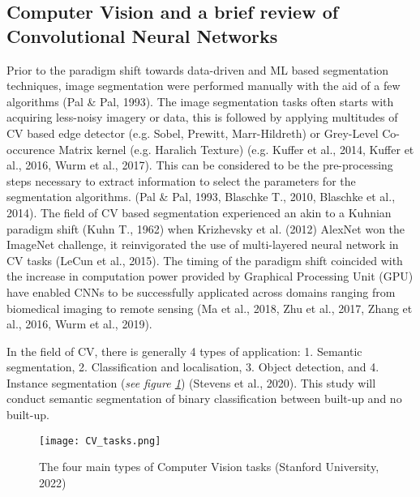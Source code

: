 \documentclass[11pt, a4paper, twoside]{report}
\begin{document}
\subsection{Computer Vision and a brief review of Convolutional Neural Networks}\label{CVinBS}

Prior to the paradigm shift towards data-driven and ML based segmentation techniques, image segmentation were performed manually with the aid of a few algorithms (Pal \& Pal, 1993). The image segmentation tasks often starts with acquiring less-noisy imagery or data, this is followed by applying multitudes of CV based edge detector (e.g. Sobel, Prewitt, Marr-Hildreth) or Grey-Level Co-occurence Matrix kernel (e.g. Haralich Texture) (e.g. Kuffer et al., 2014, Kuffer et al., 2016, Wurm et al., 2017). This can be considered to be the pre-processing steps necessary to extract information to select the parameters for the segmentation algorithms. (Pal \& Pal, 1993, Blaschke T., 2010, Blaschke et al., 2014). The field of CV based segmentation experienced an akin to a Kuhnian paradigm shift (Kuhn T., 1962) when Krizhevsky et al. (2012) AlexNet won the ImageNet challenge, it reinvigorated the use of multi-layered neural network in CV tasks (LeCun et al., 2015). The timing of the paradigm shift coincided with the increase in computation power provided by Graphical Processing Unit (GPU) have enabled CNNs to be successfully applicated across domains ranging from biomedical imaging to remote sensing (Ma et al., 2018, Zhu et al., 2017, Zhang et al., 2016, Wurm et al., 2019).\\\par

In the field of CV, there is generally 4 types of application: 1. Semantic segmentation, 2. Classification and localisation, 3. Object detection, and 4. Instance segmentation (\textit{see figure {\ref{fig:CV_tasks}}}) (Stevens et al., 2020). This study will conduct semantic segmentation of binary classification between built-up and no built-up.\\\par

\begin{figure}[H]
\centering
\texttt{[image: CV\_tasks.png]}
  \caption{The four main types of Computer Vision tasks (Stanford University, 2022)}
\label{fig:CV_tasks}
\end{figure}
\end{document}
